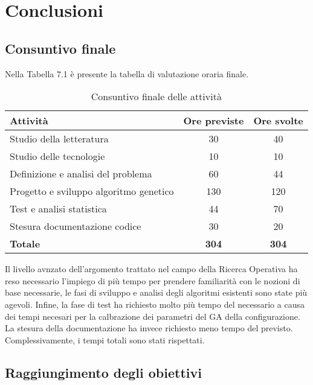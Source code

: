 \chapter{Conclusioni}
\label{cap:conclusioni}


\section{Consuntivo finale}

Nella Tabella 7.1 è presente la tabella di valutazione oraria finale.

\begin{table}[H]
    \centering
    \begin{tabular}{|l|c|c|}
    \hline
    \textbf{Attività} & \textbf{Ore previste} & \textbf{Ore svolte} \\  \hline
    Studio della letteratura & 30 & 40 \\  \hline
    Studio delle tecnologie & 10 & 10 \\  \hline
    Definizione e analisi del problema & 60 & 44 \\  \hline
    Progetto e sviluppo algoritmo genetico & 130 & 120 \\  \hline
    Test e analisi statistica & 44 & 70 \\  \hline
    Stesura documentazione codice & 30 & 20 \\  \hline
    \textbf{Totale} & \textbf{304} & \textbf{304} \\  \hline
    \end{tabular}
    \caption{Consuntivo finale delle attività}
\end{table}

Il livello avnzato dell'argomento trattato nel campo della Ricerca Operativa ha reso necessario l'impiego di più tempo per prendere familiarità con le nozioni di base necessarie, le fasi di sviluppo e analisi degli algoritmi esistenti sono state più agevoli. Infine, la fase di test ha richiesto molto più tempo del necessario a causa dei tempi necesari per la calbrazione dei parametri del GA della configurazione. La stesura della documentazione ha invece richiesto meno tempo del previsto. Complessivamente, i tempi totali sono stati rispettati.

\section{Raggiungimento degli obiettivi}

